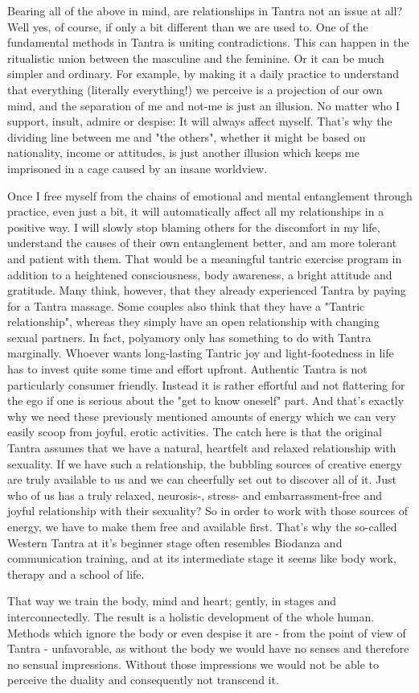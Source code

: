 Bearing all of the above in mind, are relationships in Tantra not an issue at all? Well yes, of course, if only a bit different than we are used to. One of the fundamental methods in Tantra is uniting contradictions. This can happen in the ritualistic union between the masculine and the feminine. Or it can be much simpler and ordinary. For example, by making it a daily practice to understand that everything (literally everything!) we perceive is a projection of our own mind, and the separation of me and not-me is just an illusion. No matter who I support, insult, admire or despise: It will always affect myself. That's why the dividing line between me and "the others", whether it might be based on nationality, income or attitudes, is just another illusion which keeps me imprisoned in a cage caused by an insane worldview.

Once I free myself from the chains of emotional and mental entanglement through practice, even just a bit, it will automatically affect all my relationships in a positive way. I will slowly stop blaming others for the discomfort in my life, understand the causes of their own entanglement better, and am more tolerant and patient with them. That would be a meaningful tantric exercise program in addition to a heightened consciousness, body awareness, a bright attitude and gratitude. Many think, however, that they already experienced Tantra by paying for a Tantra massage. Some couples also think that they have a "Tantric relationship", whereas they simply have an open relationship with changing sexual partners. In fact, polyamory only has something to do with Tantra marginally.
Whoever wants long-lasting Tantric joy and light-footedness in life has to invest quite some time and effort upfront. Authentic Tantra is not particularly consumer friendly. Instead it is rather effortful and not flattering for the ego if one is serious about the "get to know oneself" part. And that's exactly why we need these previously mentioned amounts of energy which we can very easily scoop from joyful, erotic activities. The catch here is that the original Tantra assumes that we have a natural, heartfelt and relaxed relationship with sexuality. If we have such a relationship, the bubbling sources of creative energy are truly available to us and we can cheerfully set out to discover all of it. Just who of us has a truly relaxed, neurosis-, stress- and embarrassment-free and joyful relationship with their sexuality? So in order to work with those sources of energy, we have to make them free and available first. That's why the so-called Western Tantra at it's beginner stage often resembles Biodanza and communication training, and at its intermediate stage it seems like body work, therapy and a school of life.

That way we train the body, mind and heart; gently, in stages and interconnectedly. The result is a holistic development of the whole human. Methods which ignore the body or even despise it are - from the point of view of Tantra - unfavorable, as without the body we would have no senses and therefore no sensual impressions. Without those impressions we would not be able to perceive the duality and consequently not transcend it.

